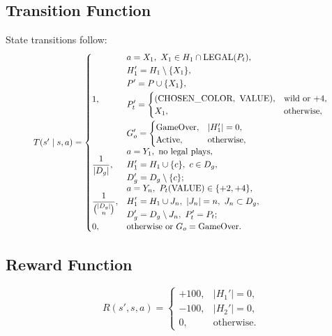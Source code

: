 \documentclass[journal,transmag]{IEEEtran}
\begin{document}
\subsection{Transition Function}

State transitions follow:
\[
\resizebox{0.88\linewidth}{!}{$
T(s' \mid s, a) =
\begin{cases}
1,
&
\begin{aligned}
&a = X_1,\ X_1 \in H_1 \cap \text{LEGAL}(P_t), \\
&H_1' = H_1 \setminus \{X_1\}, \\
&P' = P \cup \{X_1\}, \\
&P_t' =
  \begin{cases}
  (\text{CHOSEN\_COLOR},\ \text{VALUE}), & \text{wild or +4},\\
  X_1, & \text{otherwise},
  \end{cases} \\
&G_o' =
  \begin{cases}
  \text{GameOver}, & |H_1'| = 0,\\
  \text{Active}, & \text{otherwise},
  \end{cases}
\end{aligned}
\\[1.2em]

\dfrac{1}{|D_g|},
&
\begin{aligned}
&a = Y_1,\ \text{no legal plays},\\
&H_1' = H_1 \cup \{c\},\ c \in D_g,\\
&D_g' = D_g \setminus \{c\};
\end{aligned}
\\[1.2em]

\dfrac{1}{\binom{|D_g|}{n}},
&
\begin{aligned}
&a = Y_n,\ P_t(\text{VALUE}) \in \{+2,+4\},\\
&H_1' = H_1 \cup J_n,\ |J_n| = n,\ J_n \subset D_g,\\
&D_g' = D_g \setminus J_n,\ P_t' = P_t;
\end{aligned}
\\[1.2em]

0,
&\text{otherwise or } G_o = \text{GameOver}.
\end{cases}
$}
\]


\subsection{Reward Function}

\[
R(s', s, a) =
\begin{cases}
+100, & |H_1'| = 0,\\
-100, & |H_2'| = 0,\\
0, & \text{otherwise}.
\end{cases}
\]
\end{document}
